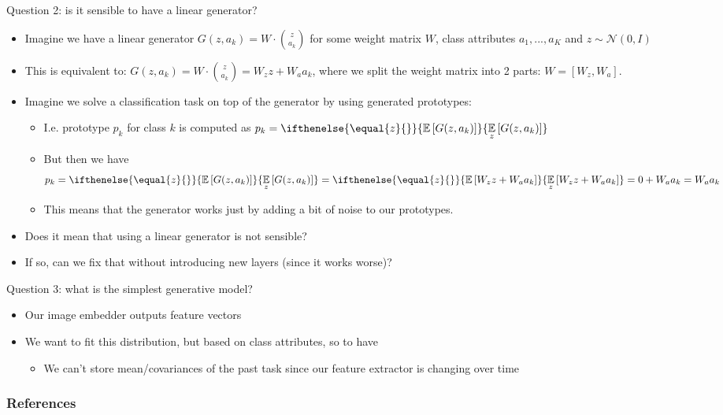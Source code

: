 \documentclass[10pt]{beamer}
\newcommand{\expect}[2][]{
\ifthenelse{\equal{#1}{}}{
\mathbb{E}\left[#2\right]
}{
\underset{#1}{\mathbb{E}}\left[#2\right]
}}
\begin{document}
\begin{frame}{Question 2: is it sensible to have a linear generator?}
    \begin{itemize}
        \item\pause Imagine we have a linear generator $G(z, a_k) = W \cdot \binom{z}{a_k}$ for some weight matrix $W$, class attributes $a_1, ..., a_K$ and $z \sim \mathcal{N}(0,I)$
        \item\pause This is equivalent to: $G(z, a_k) = W \cdot \binom{z}{a_k} = W_z z + W_a a_k$, where we split the weight matrix into 2 parts: $W = [W_z, W_a]$.
        \item\pause Imagine we solve a classification task on top of the generator by using generated prototypes:
        \begin{itemize}
            \item\pause I.e. prototype $p_k$ for class $k$ is computed as $p_k = \expect[z]{G(z, a_k)}$
            \item\pause But then we have
            \[
p_k = \expect[z]{G(z, a_k)} = \expect[z]{W_z z + W_a a_k} = 0 + W_a a_k = W_a a_k
            \]
            \item\pause This means that the generator works just by adding a bit of noise to our prototypes.
        \end{itemize}
        \item\pause Does it mean that using a linear generator is not sensible?
        \item If so, can we fix that without introducing new layers (since it works worse)?
    \end{itemize}
\end{frame}

\begin{frame}{Question 3: what is the simplest generative model?}
    \begin{itemize}
        \item\pause Our image embedder outputs feature vectors
        \item\pause We want to fit this distribution, but based on class attributes, so to have
        \begin{itemize}
            \item We can't store mean/covariances of the past task since our feature extractor is changing over time
        \end{itemize}
    \end{itemize}
\end{frame}


\begin{frame}
    \frametitle{References}
    \printbibliography[heading=none]
\end{frame}
\end{document}
